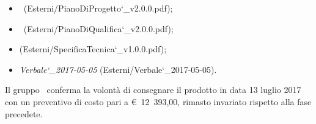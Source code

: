 \documentclass[a4paper,12pt]{article}
\begin{document}
\begin{titlepage}
\begin{itemize}
			\item \pianodiprogettoRP\ (Esterni/PianoDiProgetto\char`_v2.0.0.pdf);
			\item \pianodiqualificaRP\ (Esterni/PianoDiQualifica\char`_v2.0.0.pdf);
			\item \specificatecnicaRP (Esterni/SpecificaTecnica\char`_v1.0.0.pdf);			
			\item \textit{Verbale\char`_2017-05-05} (Esterni/Verbale\char`_2017-05-05).
		\end{itemize}	
		Il gruppo \kaleidoscode\ conferma la volontà di consegnare il prodotto in data 13 luglio 2017
		 con un preventivo di costo pari a \hbox{\euro\ 12 393,00},
		  rimasto invariato rispetto alla fase precedete.\\ 
		

\end{titlepage}
\end{document}
